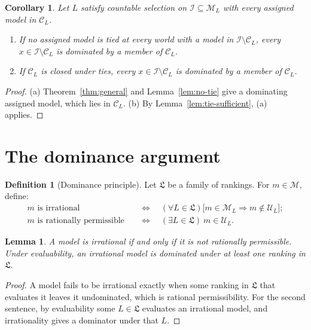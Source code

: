 \documentclass[11pt]{article}
\newtheorem{lemma}[theorem]{Lemma}
\newtheorem{corollary}[theorem]{Corollary}
\theoremstyle{definition}
\newtheorem{definition}[theorem]{Definition}
\theoremstyle{remark}
\newcommand{\M}{\mathcal M}
\newcommand{\C}{\mathcal C}
\newcommand{\I}{\mathcal I}
\newcommand{\U}{\mathcal U}
\newcommand{\Lf}{\mathfrak L}
\begin{document}
\begin{corollary}\label{cor:coherent-assigned}
Let $L$ satisfy countable selection on $\I\subseteq\M_L$ with every assigned model in $\C_L$.
\begin{enumerate}[label=(\alph*)]
\item If no assigned model is tied at every world with a model in $\I\setminus\C_L$, every $x\in\I\setminus\C_L$ is dominated by a member of $\C_L$.
\item If $\C_L$ is closed under ties, every $x\in\I\setminus\C_L$ is dominated by a member of $\C_L$.
\end{enumerate}
\end{corollary}
\begin{proof}
(a) Theorem~\ref{thm:general} and Lemma~\ref{lem:no-tie} give a dominating assigned model, which lies in $\C_L$. (b) By Lemma~\ref{lem:tie-sufficient}, (a) applies.
\end{proof}
\endgroup

\section{The dominance argument}\label{sec:conclusion}

\begin{definition}[Dominance principle]\label{def:permissibility}
Let $\Lf$ be a family of rankings. For $m\in\M$, define:
\begin{align*}
m\text{ is irrational}&\quad\Longleftrightarrow\quad (\forall L\in\Lf)\bigl[m\in\M_L\Rightarrow m\notin\U_L\bigr];\\
m\text{ is rationally permissible}&\quad\Longleftrightarrow\quad (\exists L\in\Lf)\ m\in\U_L.
\end{align*}
\end{definition}

\begin{lemma}\label{lem:complement}
A model is irrational if and only if it is not rationally permissible. Under evaluability, an irrational model is dominated under at least one ranking in $\Lf$.
\end{lemma}
\begin{proof}
A model fails to be irrational exactly when some ranking in $\Lf$ that evaluates it leaves it undominated, which is rational permissibility. For the second sentence, by evaluability some $L\in\Lf$ evaluates an irrational model, and irrationality gives a dominator under that $L$.
\end{proof}
\end{document}
